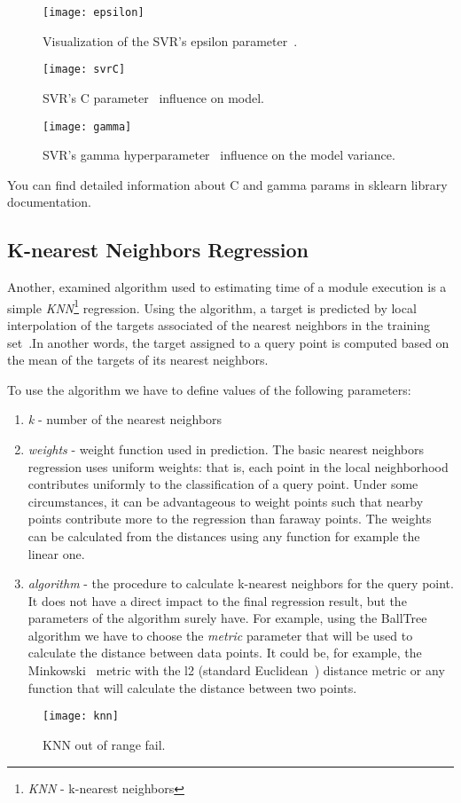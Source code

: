 \begin{figure}[!htb]
	\caption{Visualization of the SVR's epsilon parameter~.}
	\centering
	\label{fig:epsilon}
	\texttt{[image: epsilon]}
\end{figure}
\begin{figure}[!htb]
	\caption{SVR's C parameter~ influence on model.}
	\centering
	\label{fig:svrc}
	\texttt{[image: svrC]}
\end{figure}
\begin{figure}[!htb]
	\caption{SVR's gamma hyperparameter~ influence on the model variance.}
	\centering
	\label{fig:gamma}
	\texttt{[image: gamma]}
\end{figure}
You can find detailed information about C and gamma params in sklearn library documentation\cite{rbf_params}.

\subsection{K-nearest Neighbors Regression}

Another, examined algorithm used to estimating time of a module execution is a simple \textit{KNN}\footnote{\textit{KNN} - k-nearest neighbors} regression. Using the algorithm, a target is predicted by local interpolation of the targets associated of the nearest neighbors in the training set~\cite{knnreg}.In another words, the target assigned to a query point is computed based on the mean of the targets of its nearest neighbors.

To use the algorithm we have to define values of the following parameters:
\begin{enumerate}
	\item \textit{k} - number of the nearest neighbors
	\item \textit{weights} - weight function used in prediction. The basic nearest neighbors regression uses uniform weights: that is, each point in the local neighborhood contributes uniformly to the classification of a query point. Under some circumstances, it can be advantageous to weight points such that nearby points contribute more to the regression than faraway points. The weights can be calculated from the distances using any function for example the linear one.
	\item \textit{algorithm} - the procedure to calculate k-nearest neighbors for the query point. It does not have a direct impact to the final regression result, but the parameters of the algorithm surely have. For example, using the BallTree algorithm we have to choose the \textit{metric} parameter that will be used to calculate the distance between data points. It could be, for example, the Minkowski~\cite{minkowski} metric with the l2 (standard Euclidean~\cite{euclidean}) distance metric or any function that will calculate the distance between two points.
\end{enumerate}

\begin{figure}[!htb]
	\caption{KNN out of range fail.}
	\centering
	\label{fig:knn}
	\texttt{[image: knn]}
\end{figure}